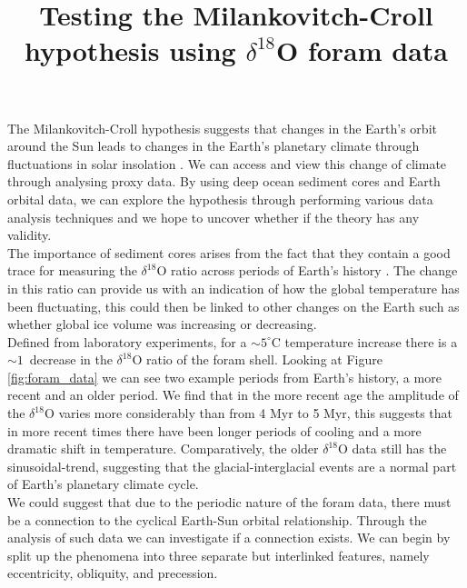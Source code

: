 \documentclass[12pt, onecolumn]{revtex4}    %
\begin{document}
                     

\title{Testing the Milankovitch-Croll hypothesis using $\delta^{18}$O foram data} 
\maketitle

\vspace{-4ex}

The Milankovitch-Croll hypothesis suggests that changes in the Earth's orbit around the Sun leads to changes in the Earth's planetary climate through fluctuations in solar insolation \cite{ruddiman_climate}. We can access and view this change of climate through analysing proxy data. By using deep ocean sediment cores and Earth orbital data, we can explore the hypothesis through performing various data analysis techniques and we hope to uncover whether if the theory has any validity. \\

The importance of sediment cores arises from the fact that they contain a good trace for measuring the $\delta^{18}$O ratio across periods of Earth's history \cite{droxler_climate}. The change in this ratio can provide us with an indication of how the global temperature has been fluctuating, this could then be linked to other changes on the Earth such as whether global ice volume was increasing or decreasing. \\

Defined from laboratory experiments, for a $\sim 5^{\circ}\mathrm{C}$ temperature increase there is a $\sim 1$\textperthousand\ decrease in the $\delta^{18}$O ratio of the foram shell. Looking at Figure \ref{fig:foram_data} we can see two example periods from Earth's history, a more recent and an older period. We find that in the more recent age the amplitude of the $\delta^{18}$O varies more considerably than from 4 Myr to 5 Myr, this suggests that in more recent times there have been longer periods of cooling and a more dramatic shift in temperature. Comparatively, the older $\delta^{18}$O data still has the sinusoidal-trend, suggesting that the glacial-interglacial events are a normal part of Earth's planetary climate cycle. \\


We could suggest that due to the periodic nature of the foram data, there must be a connection to the cyclical Earth-Sun orbital relationship. Through the analysis of such data we can investigate if a connection exists. We can begin by split up the phenomena into three separate but interlinked features, namely eccentricity, obliquity, and precession. \\
\end{document}
